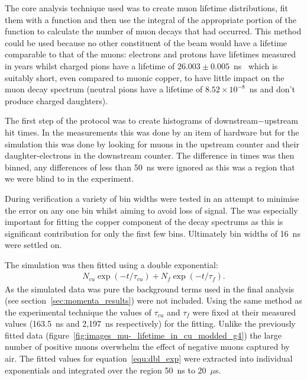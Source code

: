 The core analysis technique used was to create muon lifetime distributions, fit them with a function and then use the integral of the appropriate portion of the function to calculate the number of muon decays that had occurred. This method could be used because no other constituent of the beam would have a lifetime comparable to that of the muons: electrons and protons have lifetimes measured in years whilst charged pions have a lifetime of \(26.003\pm0.005\)~ns~\cite{pdg} which is suitably short, even compared to muonic copper, to have little impact on the muon decay spectrum (neutral pions have a lifetime of \( 8.52\times10^{-8}\)~ns and don't produce charged daughters).

The first step of the protocol was to create histograms of downstream\(-\)upstream hit times. In the measurements this was done by an item of hardware but for the simulation this was done by looking for muons in the upstream counter and their daughter-electrons in the downstream counter. The difference in times was then binned, any differences of less than 50~ns were ignored as this was a region that we were blind to in the experiment.

During verification a variety of bin widths were tested in an attempt to minimise the error on any one bin whilst aiming to avoid loss of signal. The was especially important for fitting the copper component of the decay spectrums as this is significant contribution for only the first few bins. Ultimately bin widths of 16~ns were settled on.

The simulation was then fitted using a double exponential: 
\begin{align}
    N_{cu}\exp(-t/\tau_{cu}) + N_{f}\exp(-t/\tau_{f}). \label{equ:dbl_exp}
\end{align}
As the simulated data was pure the background terms used in the final analysis (see section~\ref{sec:momenta_results}) were not included. Using the same method as the experimental technique the values of \(\tau_{cu}\) and \(\tau_{f}\) were fixed at their measured values (163.5~ns and 2,197~ns respectively) for the fitting. Unlike the previously fitted data (figure~\ref{fig:images_mu-_lifetime_in_cu_modded_g4}) the large number of positive muons overwhelm the effect of negative muons captured by air. The fitted values for equation~\eqref{equ:dbl_exp} were extracted into individual exponentials and integrated over the region 50~ns to 20~\(\mu\)s. 

